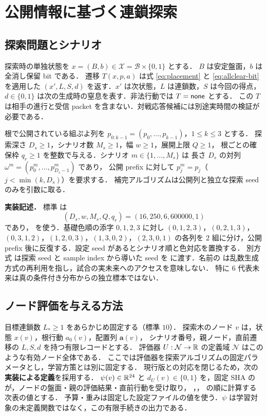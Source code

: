 \section{公開情報に基づく連鎖探索}\label{sec:search}
\subsection{探索問題とシナリオ}
探索時の単独状態を $x=(B,b)\in\mathcal X=\mathcal B\times\{0,1\}$ とする．
$B$ は安定盤面，$b$ は全消し保留 bit である．
遷移 $T(x,p,a)$ は式 \eqref{eq:placement} と \eqref{eq:allclear-bit} を適用した
$(x',L,S,d)$ を返す．$x'$ は次状態，$L$ は連鎖数，$S$ は今回の得点，
$d\in\{0,1\}$ は次の生成時の窒息を表す．非法行動では $T=\mathsf{none}$ とする．
この $T$ は相手の進行と受信 packet を含まない．対戦応答候補には別途実時間の検証が必要である．

根で公開されている組ぷよ列を $p_{0:k-1}=(p_0,\ldots,p_{k-1})$，$1\le k\le3$ とする．
探索深さ $D_s\ge1$，シナリオ数 $M_s\ge1$，幅 $w\ge1$，展開上限 $Q\ge1$，
根ごとの確保枠 $q_r\ge1$ を整数で与える．シナリオ $m\in\{1,\ldots,M_s\}$ は
長さ $D_s$ の対列 $\omega^m=(p_0^m,\ldots,p_{D_s-1}^m)$ であり，
公開 prefix に対して $p_j^m=p_j$（$j<\min(k,D_s)$）を要求する．
補完アルゴリズムは公開列と独立な探索 seed のみを引数に取る．

\textbf{実装記述．} 標準  は
\begin{equation}\label{eq:profile}
 (D_s,w,M_s,Q,q_r)=(16,250,6,600000,1)
\end{equation}
であり， を使う．基礎色順の添字 $0,1,2,3$ に対し
$(0,1,2,3)$，$(0,2,1,3)$，$(0,3,1,2)$，$(1,2,0,3)$，$(1,3,0,2)$，$(2,3,0,1)$
の各列を $2$ 組に分け，公開 prefix 後に反復する．設定 seed があるとシナリオ順と色対応を置換する．
別方式  は探索 seed と sample index から導いた seed を
 に渡す．名前の  は乱数生成方式の再利用を指し，試合の実未来へのアクセスを意味しない．
特に $6$ 代表未来は真の条件付き分布からの独立標本ではない．

\subsection{ノード評価を与える方法}\label{sec:evaluator}
目標連鎖数 $L_*\ge1$ をあらかじめ固定する（標準 $10$）．
探索木のノード $v$ は，状態 $x(v)$，根行動 $a_0(v)$，配置列 $\mathbf a(v)$，
シナリオ番号，親ノード，直前遷移の $L,S,d$ を持つ有限レコードとする．
評価器 $U:\mathcal N\to\mathbb{R}$ の定義域 $\mathcal N$ はこのような有効ノード全体である．
ここでは評価器を探索アルゴリズムの固定パラメータとし，学習方策とは別に固定する．
現行版との対応を閉じるため，次の\textbf{実装による定義}を採用する．
$\psi(v)\in\mathbb{R}^{24}$ と $d_U(v)\in\{0,1\}$ を，固定 SHA の
 が，ノードの盤面・親の評価結果・直前行動を受け取り，
，， の順に計算する次表の値とする．
予算・重みは固定した設定ファイルの値を使う．$\psi$ は学習対象の未定義関数ではなく，この有限手続きの出力である．

